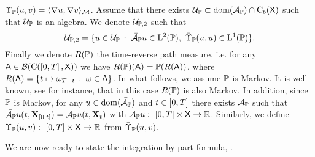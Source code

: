 $\bar{\Upsilon}_{\mathbb{P}}(u,v) = \langle \nabla u, \nabla v \rangle_\mathcal M$. Assume that there exists
$\mathcal{U}_{\mathbb{P}} \subset \mathrm{dom}(\bar{\mathcal{A}}_{\mathbb{P}}) \cap \mathrm{C}_b(\mathsf{X})$ such that
$\mathcal{U}_{\mathbb{P}}$ is an algebra. We denote $\mathcal{U}_{\mathbb{P},2}$ such that
\begin{equation}
  \mathcal{U}_{\Pbb,2} = \ensembleLigne{u \in \mathcal{U}_\Pbb}{\generatorb_\Pbb u \in \mathrm{L}^2(\Pbb), \ \carrechampb_\Pbb(u,u) \in \mathrm{L}^1(\Pbb)}  . 
\end{equation}
Finally we denote $R(\mathbb{P})$ the time-reverse path measure, i.e. for any
$\mathsf{A} \in \mathcal{B}(\mathrm{C}(\left[0,T\right], \mathsf{X}))$ we have
$R(\mathbb{P})(\mathsf{A}) = \mathbb{P}(R(\mathsf{A}))$, where
$R(\mathsf{A}) = \{t \mapsto \omega_{T-t}\,:\; \omega \in \mathsf{A}\}$.  In what
follows, we assume $\mathbb{P}$ is Markov. It is well-known, see \citep[Theorem
1.2]{leonard2014reciprocal} for instance, that in this case $R(\mathbb{P})$ is also
Markov. In addition, since $\mathbb{P}$ is Markov, for any $u \in \mathrm{dom}(\bar{\mathcal{A}}_{\mathbb{P}})$ and
$t \in \left[0,T\right]$ there exists $\mathcal{A}_{\mathbb{P}}$ such that
$\bar{\mathcal{A}}_{\mathbb{P}} u(t, \mathbf{X}_{\left[0,t\right]}) = \mathcal{A}_{\mathbb{P}} u(t, \mathbf{X}_t)$ with
$\mathcal{A}_{\mathbb{P}} u: \ \left[0,T\right] \times \mathsf{X} \to \mathbb{R}$. Similarly, we define
$\Upsilon_{\mathbb{P}}(u,v): \ \left[0,T\right] \times \mathsf{X} \to \mathbb{R}$ from $\bar{\Upsilon}_{\mathbb{P}}(u,v)$.

We are now ready to state the integration by part formula,
\citep[Theorem 3.17]{cattiaux2021time}. 

